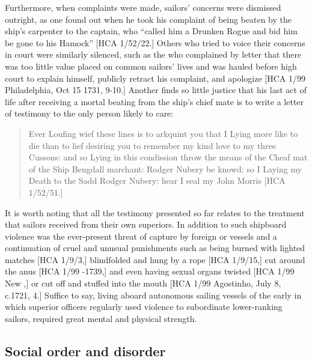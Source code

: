 Furthermore, when complaints were made, sailors’ concerns were dismissed outright, as one  found out when he took his complaint of being beaten by the ship’s carpenter to the captain, who “called him a Drunken Rogue and bid him be gone to his Hamock” [HCA 1/52/22.] Others who tried to voice their concerns in court were similarly silenced, such as the  who complained by letter that there was too little value placed on common sailors’ lives and was hauled before high court to explain himself, publicly retract his complaint, and apologize [HCA 1/99 Philadelphia, Oct 15 1731, 9-10.] Another  finds so little justice that his last act of life after receiving a mortal beating from the ship’s chief mate is to write a letter of testimony to the only person likely to care:

\begin{quotation}
Ever Loufing wief these lines is to arkquint you that I Lying more like to die than to lief desiring you to remember my kind love to my three Cussons: and so Lying in this condission throw the means of the Cheaf mat of the Ship Bengdall marchant: Rodger Nubery be knowd: so I Laying my Death to the Sadd Rodger Nubery: hear I seal my John Morris [HCA 1/52/51.] \end{quotation}

It is worth noting that all the testimony presented so far relates to the treatment that sailors received from their own superiors. In addition to such shipboard violence was the ever-present threat of capture by foreign or  vessels and a continuation of cruel and unusual punishments such as being burned with lighted matches [HCA 1/9/3,] blindfolded and hung by a rope [HCA 1/9/15,] cut around the anus [HCA 1/99 \citealt{Jamaica1738}-1739,] and even having sexual organs twisted [HCA 1/99 New \citealt{Providence1722},] or cut off and stuffed into the mouth [HCA 1/99 Agostinho, July 8, c.1721, 4.] Suffice to say, living aboard autonomous sailing vessels of the early  in which superior officers regularly used violence to subordinate lower-ranking sailors, required great mental and physical strength.

\subsection{{Social order and disorder}}%

